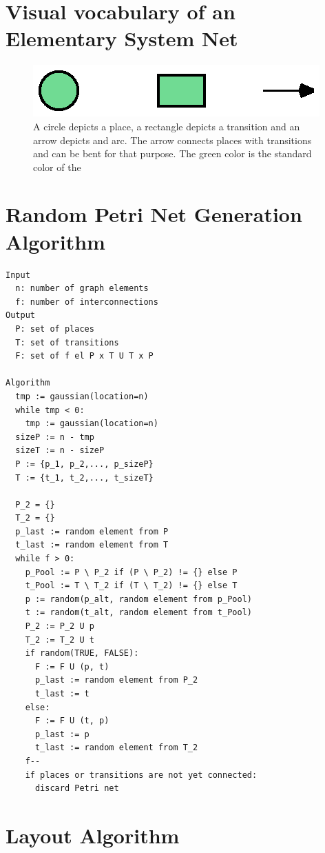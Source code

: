 \section{Visual vocabulary of an Elementary System Net}
\label{app:elsysnet}

\begin{figure}
    \includegraphics[scale=1]{graphics/visual_vocabulary_elementary_system_net}
    \caption{A circle depicts a place, a rectangle depicts a transition and an arrow depicts and arc. The arrow connects places with transitions and can be bent for that purpose. The green color is the standard color of the }
    \label{fig:visual_vocabulary_elementary_system_net}
\end{figure}

\section{Random Petri Net Generation Algorithm}
\label{app:generated}

\begin{verbatim}
Input
  n: number of graph elements
  f: number of interconnections  
Output
  P: set of places
  T: set of transitions
  F: set of f el P x T U T x P

Algorithm
  tmp := gaussian(location=n)
  while tmp < 0:
    tmp := gaussian(location=n)
  sizeP := n - tmp
  sizeT := n - sizeP
  P := {p_1, p_2,..., p_sizeP}
  T := {t_1, t_2,..., t_sizeT}
  
  P_2 = {}
  T_2 = {}
  p_last := random element from P
  t_last := random element from T
  while f > 0:
    p_Pool := P \ P_2 if (P \ P_2) != {} else P
    t_Pool := T \ T_2 if (T \ T_2) != {} else T
    p := random(p_alt, random element from p_Pool)
    t := random(t_alt, random element from t_Pool)
    P_2 := P_2 U p
    T_2 := T_2 U t
    if random(TRUE, FALSE):
      F := F U (p, t)
      p_last := random element from P_2
      t_last := t
    else:
      F := F U (t, p)
      p_last := p
      t_last := random element from T_2
    f--
    if places or transitions are not yet connected:
      discard Petri net
\end{verbatim}

\section{Layout Algorithm}
\label{app:formatted}

